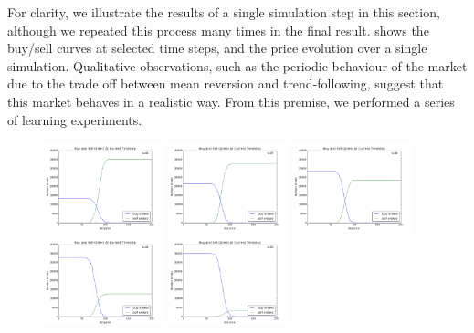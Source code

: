 \documentclass[11pt]{article}
\begin{document}
For clarity, we illustrate the results of a single simulation step in this section, although we repeated this process many times in the final result.  shows the buy/sell curves at selected time steps, and the price evolution over a single simulation. Qualitative observations, such as the periodic behaviour of the market due to the trade off between mean reversion and trend-following, suggest that this market behaves in a realistic way. From this premise, we performed a series of learning experiments.
\begin{figure}
  \centering
  \quad
  \includegraphics[width=0.31\textwidth]{figures/buy_sell_0046.png}
  \includegraphics[width=0.31\textwidth]{figures/buy_sell_0047.png}
  \includegraphics[width=0.31\textwidth]{figures/buy_sell_0048.png}
  \includegraphics[width=0.31\textwidth]{figures/buy_sell_0049.png}
  \includegraphics[width=0.31\textwidth]{figures/buy_sell_0050.png}

\end{figure}
\end{document}
